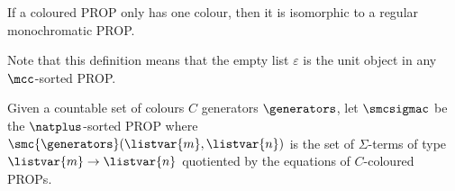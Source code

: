 \begin{remark}
    If a coloured PROP only has one colour, then it is isomorphic to a regular
    monochromatic PROP.
\end{remark}

Note that this definition means that the empty list \(\varepsilon\) is the unit
object in any \(\mcc\)-sorted PROP.

\begin{definition}\label{def:freely-generated-coloured-prop}
    Given a countable set of colours \(C\) generators \(\generators\), let
    \(\smcsigmac\) be the
    \(\natplus\)-sorted PROP where
    \(\smc{\generators}(\listvar{m}, \listvar{n})\) is the set of
    \(\Sigma\)-terms of type \(\listvar{m} \to \listvar{n}\) quotiented by
    the equations of \(C\)-coloured PROPs.
\end{definition}
